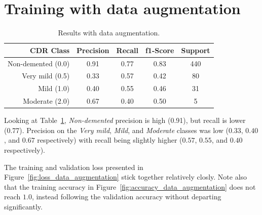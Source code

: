 \documentclass{kththesis}
\begin{document}
\section{Training with data augmentation}

\begin{table}[H]
  \begin{center}
    \caption{Results with data augmentation. \label{tab:results_data_augmentation}}
    \begin{tabular}{r|ccc|c}
      \textbf{CDR Class} & \textbf{Precision} & \textbf{Recall} & \textbf{f1-Score} & \textbf{Support} \\
      \toprule
           Non-demented (0.0) &  0.91   &  0.77  &   0.83   &   440 \\
           Very mild (0.5) &  0.33   &  0.57  &   0.42   &    80 \\
           Mild (1.0)         &  0.40   &  0.55  &   0.46   &    31 \\
           Moderate (2.0)     &  0.67   &  0.40  &   0.50   &     5 \\
    \end{tabular}
  \end{center}
\end{table}

Looking at Table~\ref{tab:results_data_augmentation}, \textit{Non-demented} precision is high (0.91), but recall is lower (0.77). Precision on the \textit{Very mild}, \textit{Mild}, and \textit{Moderate} classes was low ($0.33$, $0.40$, and $0.67$ respectively) with recall being slightly higher ($0.57$, $0.55$, and $0.40$ respectively).

The training and validation loss presented in Figure~\ref{fig:loss_data_augmentation} stick together relatively closly. Note also that the training accuracy in Figure~\ref{fig:accuracy_data_augmentation} does not reach $1.0$, instead following the validation accuracy without departing significantly.
\end{document}
